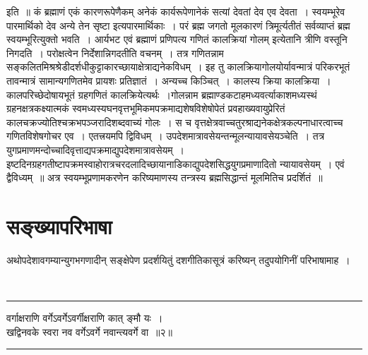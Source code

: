 \documentclass[12pt,a4paper]{report}
\newenvironment{moola}
{
~\\
\hrule
\begin{center}
\begin{LARGE}
}
{
\end{LARGE}
\end{center}
\hrule
~\\
}
\begin{document}
इति~॥ कं ब्रह्माणं एकं कारणरूपेणैकम् अनेकं कार्यरूपेणानेकं सत्यां देवतां देव एव देवता~। स्वयम्भूरेव पारमार्थिको देव अन्ये तेन सृष्टा इत्यपारमार्थिकाः~। परं ब्रह्म जगतो मूलकारणं त्रिमूर्त्यतीतं सर्वव्याप्तं ब्रह्म स्वयम्भूरित्युक्तो भवति~। आर्यभट एवं ब्रह्माणं प्रणिपत्य गणितं कालक्रियां गोलम् इत्येतानि त्रीणि वस्तूनि निगदति~। परोक्षत्वेन निर्देशान्निगदतीति वचनम्~। तत्र गणितन्नाम सङ्कलितमिश्रश्रेडीदर्शधीकुट्टाकारच्छायाक्षेत्राद्यनेकविधम्~। इह तु कालक्रियागोलयोर्यावन्मात्रं परिकरभूतं तावन्मात्रं सामान्यगणितमेव प्रायशः प्रतिज्ञातं~। अन्यच्च किञ्चित्~। कालस्य क्रिया कालक्रिया~। कालपरिच्छेदोषायभूतं ग्रहगणितं कालक्रियेत्यर्थः~।गोलन्नाम ब्रह्माण्डकटाहमध्यवर्त्याकाशमध्यस्थं ग्रहनक्षत्रकक्ष्यात्मकं स्वमध्यस्यघनवृत्तभूमिकमपक्रमाद्यशेषविशेषोपेतं प्रवहाख्यवायुप्रेरितं कालचक्रज्योतिश्चक्रभपञ्जरादिशब्दवाच्यं गोलः~। स च वृत्तक्षेत्रवाच्चतुरश्राद्यनेकक्षेत्रकल्पनाधारत्वाच्च गणितविशेषगोचर एव~। एतत्त्रयमपि
द्विविधम्~। उपदेशमात्रावसेयन्तन्मूलन्यायावसेयञ्चेति~। तत्र युगप्रमाणमन्दोच्चादिवृत्ताद्यपक्रमाद्युपदेशमात्रावसेयम्~। इष्टदिनग्रहगतीष्टापक्रमस्वाहोरात्रचरदलादिच्छायानाडिकाद्युपदेशसिद्धयुगप्रमाणादितो न्यायावसेयम्~। एवं द्वैविध्यम्~॥ अत्र स्वयम्भूप्रणामकरणेन करिष्यमाणस्य तन्त्रस्य ब्रह्मसिद्धान्तं मूलमितिच प्रदर्शितं~॥

\section{सङ्ख्यापरिभाषा}

अथोपदेशावगम्यान्युगभगणादीन् सङ्क्षेपेण प्रदर्शयितुं दशगीतिकासूत्रं करिष्यन् तदुपयोगिनीं परिभाषामाह~।

\begin{moola}
वर्गाक्षराणि वर्गेऽवर्गेऽवर्गीक्षराणि कात् ङ्मौ यः~।\\
खद्विनवके स्वरा नव वर्गेऽवर्गे नवान्त्यवर्गे वा~॥२॥
 \end{moola}
\end{document}
